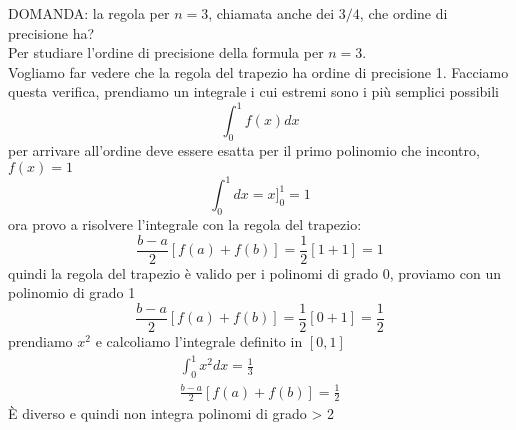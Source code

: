 \documentclass[a4paper, portrait]{book}
\numberwithin{equation}{chapter} %
\begin{document}
\begin{figure}[h!]
    \centering
    \caption{}
\end{figure}
\newpage
DOMANDA: la regola per $n=3$, chiamata anche dei $3/4$, che ordine di precisione ha?\\
Per studiare l'ordine di precisione della formula per $n=3$.\\
Vogliamo far vedere che la regola del trapezio ha ordine di precisione 1. Facciamo questa verifica, prendiamo un integrale i cui estremi sono i più semplici possibili
\begin{equation}
    \int_0^1 f(x) dx
\end{equation}
per arrivare all'ordine deve essere esatta per il primo polinomio che incontro, $f(x) =1$
\begin{equation}
    \int_0^1 dx = x]_0^1 = 1
\end{equation}
ora provo a risolvere l'integrale con la regola del trapezio:
\begin{equation}
    \frac{b-a}{2}[f(a)+f(b)] = \frac{1}{2}[1+1] = 1
\end{equation}
quindi la regola del trapezio è valido per i polinomi di grado 0, proviamo con un polinomio di grado 1
\begin{equation}
    \frac{b-a}{2}[f(a)+f(b)] = \frac{1}{2}[0+1] = \frac{1}{2}
\end{equation}
prendiamo $x^2$ e calcoliamo l'integrale definito in $[0,1]$
\begin{gather}
    \int_0^1 x^2 dx = \frac{1}{3}\\
    \frac{b-a}{2}[f(a)+f(b)] = \frac{1}{2}
\end{gather}
È diverso e quindi non integra polinomi di grado > 2
\end{document}
